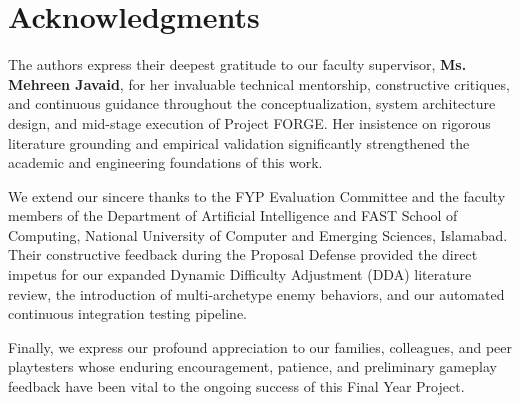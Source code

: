 \chapter*{Acknowledgments}

The authors express their deepest gratitude to our faculty supervisor, \textbf{Ms. Mehreen Javaid}, for her invaluable technical mentorship, constructive critiques, and continuous guidance throughout the conceptualization, system architecture design, and mid-stage execution of Project FORGE. Her insistence on rigorous literature grounding and empirical validation significantly strengthened the academic and engineering foundations of this work.

We extend our sincere thanks to the FYP Evaluation Committee and the faculty members of the Department of Artificial Intelligence and FAST School of Computing, National University of Computer and Emerging Sciences, Islamabad. Their constructive feedback during the Proposal Defense provided the direct impetus for our expanded Dynamic Difficulty Adjustment (DDA) literature review, the introduction of multi-archetype enemy behaviors, and our automated continuous integration testing pipeline.

Finally, we express our profound appreciation to our families, colleagues, and peer playtesters whose enduring encouragement, patience, and preliminary gameplay feedback have been vital to the ongoing success of this Final Year Project.
